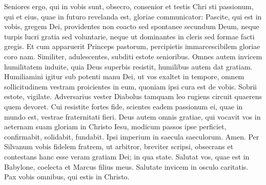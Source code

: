 \begin{biblechapter}  
\verse Seniores ergo, qui in vobis sunt, obsecro, consenior et testis Chri sti passionum, qui et eius, quae in futuro revelanda est, gloriae communicator:  
\verse Pascite, qui est in vobis, gregem Dei, providentes non coacto sed spontanee secundum Deum, neque turpis lucri gratia sed voluntarie, 
\verse neque ut dominantes in cleris sed formae facti gregis. 
\verse Et cum apparuerit Princeps pastorum, percipietis immarcescibilem gloriae coro nam. 
\verse Similiter, adulescentes, subditi estote senioribus. Omnes autem invicem humilitatem induite, quia Deus superbis resistit, humilibus autem dat gratiam. 
\verse Humiliamini igitur sub potenti manu Dei, ut vos exaltet in tempore, 
\verse omnem sollicitudinem vestram proicientes in eum, quoniam ipsi cura est de vobis.  
\verse Sobrii estote, vigilate. Adversarius vester Diabolus tamquam leo rugiens circuit quaerens quem devoret. 
\verse Cui resistite fortes fide, scientes eadem passionum ei, quae in mundo est, vestrae fraternitati fieri. 
\verse Deus autem omnis gratiae, qui vocavit vos in aeternam suam gloriam in Christo Iesu, modicum passos ipse perficiet, confirmabit, solidabit, fundabit. 
\verse Ipsi imperium in saecula saeculorum. Amen. 
\verse Per Silvanum vobis fidelem fratrem, ut arbitror, breviter scripsi, obsecrans et contestans hanc esse veram gratiam Dei; in qua state. 
\verse Salutat vos, quae est in Babylone, coelecta et Marcus filius meus. 
\verse Salutate invicem in osculo caritatis. Pax vobis omnibus, qui estis in Christo. 
\end{biblechapter}

